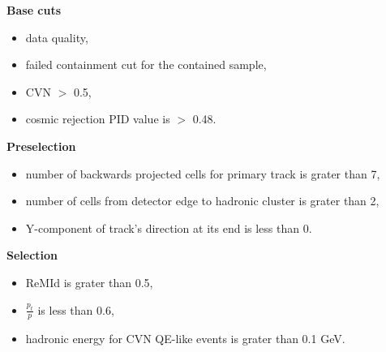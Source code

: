 \textbf{Base cuts}
\begin{itemize}
\item data quality,
\item failed containment cut for the contained sample,
\item CVN $>$ 0.5,
\item cosmic rejection PID value is $>$ 0.48.
\end{itemize}

\textbf{Preselection}
\begin{itemize}
\item number of backwards projected cells for primary track is grater than 7,
\item number of cells from detector edge to hadronic cluster is grater than 2,
\item Y-component of track's direction at its end is less than 0.
\end{itemize}

\textbf{Selection}
\begin{itemize}
\item ReMId is grater than 0.5,
\item $\frac{p_t}{p}$ is less than 0.6,
\item hadronic energy for CVN QE-like events is grater than 0.1 GeV.
\end{itemize}

